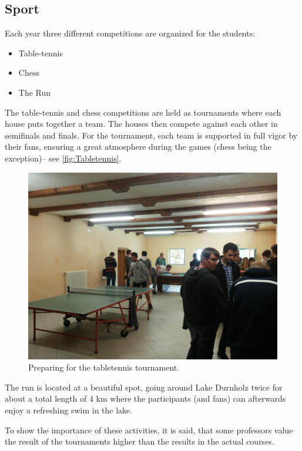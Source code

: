\subsection{Sport}
Each year three different competitions are organized for the students:
\begin{itemize}
\item Table-tennis
\item Chess
\item The Run
\end{itemize}
The table-tennis and chess competitions are held as tournaments where each house puts together a team. The houses then compete against each other in semifinals and finals. For the tournament, each team is supported in full vigor by their fans, ensuring a great atmosphere during the games (chess being the exception)-- see \autoref{fig:Tabletennis}. 
\begin{figure}[ht]%
 	\begin{center}%
 		\includegraphics[scale=0.06]{img/Tabletennis.jpg}%
 		\caption{Preparing for the tabletennis tournament.}\label{fig:Tabletennis}%
 	\end{center}%
\end{figure}

The run is located at a beautiful spot, going around Lake Durnholz twice for about a total length of 4 km where the participants (and fans) can afterwards enjoy a refreshing swim in the lake. 

To show the importance of these activities, it is said, that some professors value the result of the tournaments higher than the results in the actual courses.

